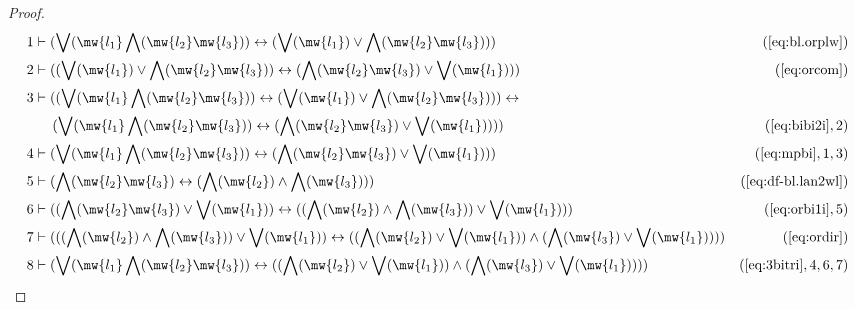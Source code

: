 \begin{proof}
\begin{align}
  1 & \vdash ( \bigvee( \mw{l_1} \bigwedge( \mw{l_2} \mw{l_3} ) )
    \leftrightarrow ( \bigvee( \mw{l_1} ) \vee \bigwedge(
    \mw{l_2} \mw{l_3} ) )
    )&(\mbox{\ref{eq:bl.orplw}})\notag
  \\ 2 & \vdash ( ( \bigvee( \mw{l_1} ) \vee \bigwedge( \mw{l_2} \mw{l_3} )
    ) \leftrightarrow ( \bigwedge( \mw{l_2} \mw{l_3} )
    \vee \bigvee( \mw{l_1} ) )
    )&(\mbox{\ref{eq:orcom}})\notag
  \\ 3 & \vdash ( ( \bigvee( \mw{l_1} \bigwedge( \mw{l_2} \mw{l_3} ) )
    \leftrightarrow ( \bigvee( \mw{l_1} ) \vee \bigwedge(
    \mw{l_2} \mw{l_3} ) ) ) \leftrightarrow \notag
    \\ &~~~~( \bigvee(
    \mw{l_1} \bigwedge( \mw{l_2} \mw{l_3} ) )
    \leftrightarrow ( \bigwedge( \mw{l_2} \mw{l_3} ) \vee
    \bigvee( \mw{l_1} ) ) )
    )&(\mbox{\ref{eq:bibi2i}},2)\notag
  \\ 4 & \vdash ( \bigvee( \mw{l_1} \bigwedge( \mw{l_2} \mw{l_3} ) )
    \leftrightarrow ( \bigwedge( \mw{l_2} \mw{l_3} ) \vee
    \bigvee( \mw{l_1} ) )
    )&(\mbox{\ref{eq:mpbi}},1,3)\notag
  \\ 5 & \vdash ( \bigwedge( \mw{l_2} \mw{l_3} ) \leftrightarrow (
    \bigwedge( \mw{l_2} ) \wedge \bigwedge( \mw{l_3} ) )
    )&(\mbox{\ref{eq:df-bl.lan2wl}})\notag
  \\ 6 & \vdash ( ( \bigwedge( \mw{l_2} \mw{l_3} ) \vee \bigvee( \mw{l_1} )
    ) \leftrightarrow ( ( \bigwedge( \mw{l_2} ) \wedge
    \bigwedge( \mw{l_3} ) ) \vee \bigvee( \mw{l_1} ) )
    )&(\mbox{\ref{eq:orbi1i}},5)\notag
  \\ 7 & \vdash ( ( ( \bigwedge( \mw{l_2} ) \wedge \bigwedge( \mw{l_3} ) )
    \vee \bigvee( \mw{l_1} ) ) \leftrightarrow ( (
    \bigwedge( \mw{l_2} ) \vee \bigvee( \mw{l_1} ) )
    \wedge ( \bigwedge( \mw{l_3} ) \vee \bigvee( \mw{l_1}
    ) ) ) )&(\mbox{\ref{eq:ordir}})\notag
  \\ 8 & \vdash ( \bigvee( \mw{l_1} \bigwedge( \mw{l_2} \mw{l_3} ) )
    \leftrightarrow ( ( \bigwedge( \mw{l_2} ) \vee
    \bigvee( \mw{l_1} ) ) \wedge ( \bigwedge( \mw{l_3} )
    \vee \bigvee( \mw{l_1} ) ) )
    )&(\mbox{\ref{eq:3bitri}},4,6,7)\notag
\end{align}
\end{proof}

